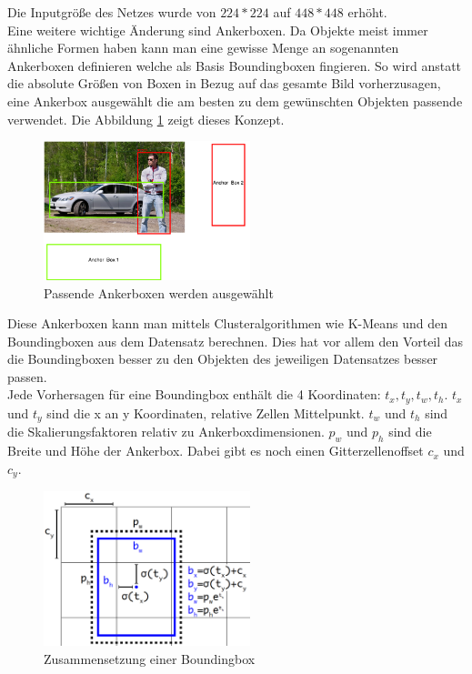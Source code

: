 \documentclass[conference]{IEEEtran}
\begin{document}
	Die Inputgröße des Netzes wurde von $224*224$ auf $448*448$ erhöht.\\
	Eine weitere wichtige Änderung sind Ankerboxen. Da Objekte meist immer ähnliche Formen haben kann man eine gewisse Menge an sogenannten Ankerboxen definieren welche als Basis Boundingboxen fingieren. So wird anstatt die absolute Größen von Boxen in Bezug auf das gesamte Bild vorherzusagen, eine Ankerbox ausgewählt die am besten zu dem gewünschten Objekten passende verwendet. Die Abbildung \ref{Anker} zeigt dieses Konzept.
	\begin{figure}[!h]
		\begin{center}
			\includegraphics[width=6cm]{Media/Ankerboxen.png}
			\caption{Passende Ankerboxen werden ausgewählt\cite{b0}}
			\label{Anker}
		\end{center}
	\end{figure}
	Diese Ankerboxen kann man mittels Clusteralgorithmen wie K-Means und den Boundingboxen aus dem Datensatz berechnen. Dies hat vor allem den Vorteil das die Boundingboxen besser zu den Objekten des jeweiligen Datensatzes besser passen.\\
	Jede Vorhersagen für eine Boundingbox enthält die 4 Koordinaten: $t_x, t_y, t_w, t_h$. $t_x$ und $ t_y$ sind die x an y Koordinaten, relative Zellen Mittelpunkt. $t_w$ und $ t_h$ sind die Skalierungsfaktoren relativ zu Ankerboxdimensionen. $p_w$ und $p_h$ sind die Breite und Höhe der Ankerbox. Dabei gibt es noch einen Gitterzellenoffset $c_x$ und $c_y$.
	\begin{figure}[!h]
		\begin{center}
			\includegraphics[width=6cm]{Media/YoloV3PredictionBox.png}
			\caption{Zusammensetzung einer Boundingbox\cite{b3}}
			\label{PredictionBox}
		\end{center}
	\end{figure}\\
\end{document}
